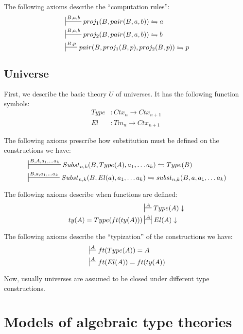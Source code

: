 \documentclass{amsart}
\theoremstyle{definition}
\theoremstyle{remark}
\numberwithin{figure}{section}
\begin{document}
The following axioms describe the ``computation rules'':
\begin{align*}
& \sststile{}{B,a,b} proj_1(B,pair(B,a,b)) \leftrightharpoons a \\
& \sststile{}{B,a,b} proj_2(B,pair(B,a,b)) \leftrightharpoons b \\
& \sststile{}{B,p} pair(B, proj_1(B,p), proj_2(B,p)) \leftrightharpoons p \\
\end{align*}

\subsection{Universe}

First, we describe the basic theory $U$ of universes.
It has the following function symbols:
\begin{align*}
Type & : Ctx_n \to Ctx_{n+1} \\
El   & : Tm_n \to Ctx_{n+1}
\end{align*}

The following axioms prescribe how substitution must be defined on the constructions we have:
\begin{align*}
& \sststile{}{B, A, a_1, \ldots a_k} Subst_{n,k}(B, Type(A), a_1, \ldots a_k) \leftrightharpoons Type(B) \\
& \sststile{}{B, a, a_1, \ldots a_k} Subst_{n,k}(B, El(a), a_1, \ldots a_k) \leftrightharpoons subst_{n,k}(B, a, a_1, \ldots a_k)
\end{align*}

The following axioms describe when functions are defined:
\begin{align*}
                        & \sststile{}{A} Type(A) \downarrow \\
ty(A) = Type(ft(ty(A))) & \ssststile{}{A} El(A) \downarrow
\end{align*}

The following axioms describe the ``typization'' of the constructions we have:
\begin{align*}
& \sststile{}{A} ft(Type(A)) = A \\
& \sststile{}{A} ft(El(A)) = ft(ty(A))
\end{align*}

Now, usually universes are assumed to be closed under different type constructions.

\section{Models of algebraic type theories}
\end{document}
